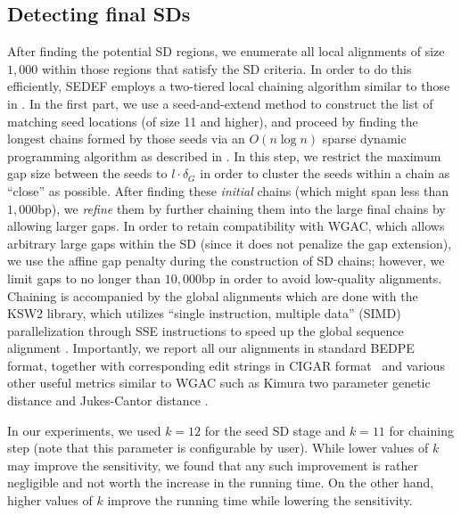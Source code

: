 \documentclass{article}
\begin{document}
\subsection{Detecting final SDs}

After finding the potential SD regions, we enumerate all local alignments of size $1,000$ within those regions that satisfy the SD criteria.
In order to do this efficiently, SEDEF employs a two-tiered local chaining algorithm similar to those in \citep{Abouelhoda03,Myers95}. In the first part, we use a seed-and-extend method to construct the list of matching seed locations (of size 11 and higher), and proceed by finding the longest chains formed by those seeds via an $O(n \log n)$ sparse dynamic programming algorithm as described in \citep{Abouelhoda03,Myers95}. In this step, we restrict the maximum gap size between the seeds to $l \cdot \delta_G$ in order to cluster the seeds within a chain as ``close'' as possible. After finding these \emph{initial} chains (which might span less than $1,000$bp), we \emph{refine} them by further chaining them into the large final chains by allowing larger gaps. In order to retain compatibility with WGAC, which allows arbitrary large gaps within the SD (since it does not penalize the gap extension), we use the affine gap penalty during the construction of SD chains; however, we limit gaps to no longer than $10,000$bp in order to avoid low-quality alignments. Chaining is accompanied by the global alignments which are done with the KSW2 library, which utilizes ``single instruction, multiple data'' (SIMD) parallelization through SSE instructions to speed up the global sequence alignment \citep{ksw2}. 
Importantly, we report all our alignments in standard BEDPE format, together with corresponding edit strings in CIGAR format~\citep{samtools} and various other useful metrics similar to  WGAC such as Kimura two parameter genetic distance \citep{Kimura72} and Jukes-Cantor distance \citep{Jukes69}.

In our experiments, we used $k=12$ for the seed SD stage and $k=11$ for chaining step (note that this parameter is configurable by user). While lower values of $k$ may improve the sensitivity, we found that any such improvement is rather negligible and not worth the increase in the running time. On the other hand, higher values of $k$ improve the running time while lowering the sensitivity.

\end{document}

